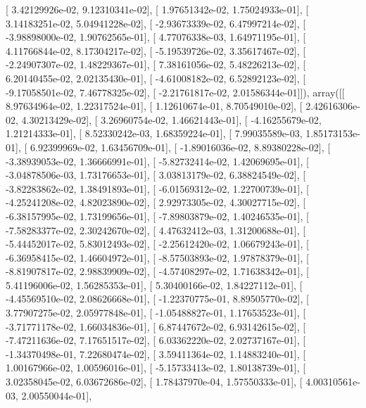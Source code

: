 \documentclass{article}
\begin{document}
       [  3.42129926e-02,   9.12310341e-02],
       [  1.97651342e-02,   1.75024933e-01],
       [  3.14183251e-02,   5.04941228e-02],
       [ -2.93673339e-02,   6.47997214e-02],
       [ -3.98898000e-02,   1.90762565e-01],
       [  4.77076338e-03,   1.64971195e-01],
       [  4.11766844e-02,   8.17304217e-02],
       [ -5.19539726e-02,   3.35617467e-02],
       [ -2.24907307e-02,   1.48229367e-01],
       [  7.38161056e-02,   5.48226213e-02],
       [  6.20140455e-02,   2.02135430e-01],
       [ -4.61008182e-02,   6.52892123e-02],
       [ -9.17058501e-02,   7.46778325e-02],
       [ -2.21761817e-02,   2.01586344e-01]]), array([[  8.97634964e-02,   1.22317524e-01],
       [  1.12610674e-01,   8.70549010e-02],
       [  2.42616306e-02,   4.30213429e-02],
       [  3.26960754e-02,   1.46621443e-01],
       [ -4.16255679e-02,   1.21214333e-01],
       [  8.52330242e-03,   1.68359224e-01],
       [  7.99035589e-03,   1.85173153e-01],
       [  6.92399969e-02,   1.63456709e-01],
       [ -1.89016036e-02,   8.89380228e-02],
       [ -3.38939053e-02,   1.36666991e-01],
       [ -5.82732414e-02,   1.42069695e-01],
       [ -3.04878506e-03,   1.73176653e-01],
       [  3.03813179e-02,   6.38824549e-02],
       [ -3.82283862e-02,   1.38491893e-01],
       [ -6.01569312e-02,   1.22700739e-01],
       [ -4.25241208e-02,   4.82023890e-02],
       [  2.92973305e-02,   4.30027715e-02],
       [ -6.38157995e-02,   1.73199656e-01],
       [ -7.89803879e-02,   1.40246535e-01],
       [ -7.58283377e-02,   2.30242670e-02],
       [  4.47632412e-03,   1.31200688e-01],
       [ -5.44452017e-02,   5.83012493e-02],
       [ -2.25612420e-02,   1.06679243e-01],
       [ -6.36958415e-02,   1.46604972e-01],
       [ -8.57503893e-02,   1.97878379e-01],
       [ -8.81907817e-02,   2.98839909e-02],
       [ -4.57408297e-02,   1.71638342e-01],
       [  5.41196006e-02,   1.56285353e-01],
       [  5.30400166e-02,   1.84227112e-01],
       [ -4.45569510e-02,   2.08626668e-01],
       [ -1.22370775e-01,   8.89505770e-02],
       [  3.77907275e-02,   2.05977848e-01],
       [ -1.05488827e-01,   1.17653523e-01],
       [ -3.71771178e-02,   1.66034836e-01],
       [  6.87447672e-02,   6.93142615e-02],
       [ -7.47211636e-02,   7.17651517e-02],
       [  6.03362220e-02,   2.02737167e-01],
       [ -1.34370498e-01,   7.22680474e-02],
       [  3.59411364e-02,   1.14883240e-01],
       [  1.00167966e-02,   1.00596016e-01],
       [ -5.15733413e-02,   1.80138739e-01],
       [  3.02358045e-02,   6.03672686e-02],
       [  1.78437970e-04,   1.57550333e-01],
       [  4.00310561e-03,   2.00550044e-01],
\end{document}

